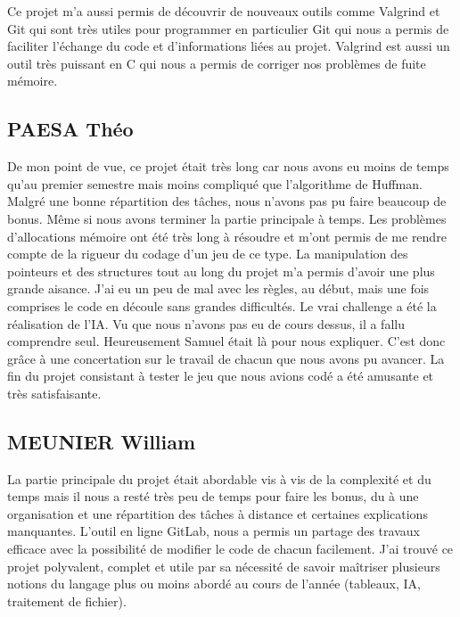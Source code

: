 \documentclass{article}
\begin{document}
    Ce projet m'a aussi permis de découvrir de nouveaux outils comme Valgrind et Git qui sont très utiles pour programmer en particulier Git qui nous a permis de faciliter l'échange du code et d'informations liées au projet. Valgrind est aussi un outil très puissant en C qui nous a permis de corriger nos problèmes de fuite mémoire.
    
    \subsection{PAESA Théo}
    De mon point de vue, ce projet était très long car nous avons eu moins de temps qu'au premier semestre mais moins compliqué que l'algorithme de Huffman. Malgré une bonne répartition des tâches, nous n'avons pas pu faire beaucoup de bonus. Même si nous avons terminer la partie principale à temps. Les problèmes d'allocations mémoire ont été très long à résoudre et m'ont permis de me rendre compte de la rigueur du codage d'un jeu de ce type. La manipulation des pointeurs et des structures tout au long du projet m'a permis d'avoir une plus grande aisance. J'ai eu un peu de mal avec les règles, au début, mais une fois comprises le code en découle sans grandes difficultés. Le vrai challenge a été la réalisation de l'IA. Vu que nous n'avons pas eu de cours dessus, il a fallu comprendre seul. Heureusement Samuel était là pour nous expliquer. C'est donc grâce à une concertation sur le travail de chacun que nous avons pu avancer. La fin du projet consistant à tester le jeu que nous avions codé a été amusante et très satisfaisante.
    
    \subsection{MEUNIER William}
    
        La partie principale du projet était abordable vis à vis de la complexité et du temps mais il nous a resté très peu de temps pour faire les bonus, du à une organisation et une répartition des tâches à distance et certaines explications manquantes. L'outil en ligne GitLab, nous a permis un partage des travaux efficace avec la possibilité de modifier le code de chacun facilement. J'ai trouvé ce projet polyvalent, complet et utile par sa nécessité de savoir maîtriser plusieurs notions du langage plus ou moins abordé au cours de l'année (tableaux, IA, traitement de fichier).     
\end{document}
